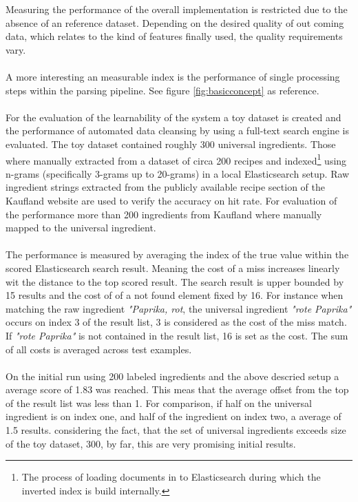 Measuring the performance of the overall implementation is restricted due to the absence of an reference dataset. Depending on the desired quality of out coming data, which relates to the kind of features finally used, the quality requirements vary. 
\\\\
A more interesting an measurable index is the performance of single processing steps within the parsing pipeline. See figure \ref{fig:basicconcept} as reference. 
\\\\
For the evaluation of the learnability of the system a toy dataset is created and the performance of automated data cleansing by using a full-text search engine is evaluated. The toy dataset contained roughly 300 universal ingredients. Those where manually extracted from a dataset of circa 200 recipes and indexed\footnote{The process of loading documents in to Elasticsearch during which the inverted index is build internally.} using n-grams (specifically 3-grams up to 20-grams) in a local Elasticsearch setup. Raw ingredient strings extracted from the publicly available recipe section of the Kaufland website are used to verify the accuracy on hit rate. For evaluation of the performance more than 200 ingredients from Kaufland where manually mapped to the universal ingredient. 
\\\\
The performance is measured by averaging the index of the true value within the scored Elasticsearch search result. Meaning the cost of a miss increases linearly wit the distance to the top scored result. The search result is upper bounded by 15 results and the cost of of a not found element fixed by 16.  For instance when matching the raw ingredient \textit{"Paprika, rot}, the universal ingredient \textit{"rote Paprika"} occurs on index 3 of the result list, 3 is considered as the cost of the miss match. If \textit{"rote Paprika"} is not contained in the result list, 16 is set as the cost. The sum of all costs is averaged across test examples.
\\\\
On the initial run using 200 labeled ingredients and the above descried setup a average score of 1.83 was reached. This meas that the average offset from the top of the result list was less than 1. For comparison, if half on the universal ingredient is on index one, and half of the ingredient on index two, a average of 1.5 results. considering the fact, that the set of universal ingredients exceeds size of the toy dataset, 300, by far, this are very promising initial results. 

